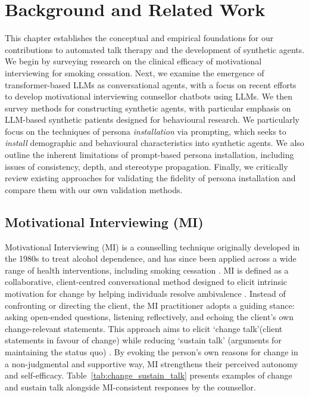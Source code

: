 \chapter{Background and Related Work}
\label{ch:background}
This chapter establishes the conceptual and empirical foundations for our contributions to automated talk therapy and the development of synthetic agents. We begin by surveying research on the clinical efficacy of motivational interviewing for smoking cessation. Next, we examine the emergence of transformer-based LLMs as conversational agents, with a focus on recent efforts to develop motivational interviewing counsellor chatbots using LLMs. We then survey methods for constructing synthetic agents, with particular emphasis on LLM-based synthetic patients designed for behavioural research. We particularly focus on the techniques of persona \emph{installation} via prompting, which seeks to \emph{install} demographic and behavioural characteristics into synthetic agents. We also outline the inherent limitations of prompt-based persona installation, including issues of consistency, depth, and stereotype propagation. Finally, we critically review existing approaches for validating the fidelity of persona installation and compare them with our own validation methods.


\section{Motivational Interviewing (MI)}
Motivational Interviewing (MI) is a counselling technique originally developed in the 1980s to treat alcohol dependence, and has since been applied across a wide range of health interventions, including smoking cessation \cite{Miller1983, MillerRollnick2023}. MI is defined as a collaborative, client-centred conversational method designed to elicit intrinsic motivation for change by helping individuals resolve ambivalence \cite{MillerRollnick2002}. Instead of confronting or directing the client, the MI practitioner adopts a guiding stance: asking open-ended questions, listening reflectively, and echoing the client's own change-relevant statements.   This approach aims to elicit `change talk'(client statements in favour of change) while reducing `sustain talk'  (arguments for maintaining the status quo) \cite{MillerRose2009}. By evoking the person's own reasons for change in a non-judgmental and supportive way, MI strengthens their perceived autonomy and self-efficacy. Table~\ref{tab:change_sustain_talk} presents examples of change and sustain talk alongside MI-consistent responses by the counsellor.


